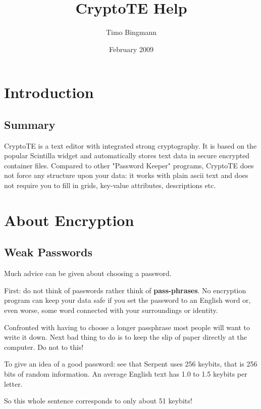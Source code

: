 \documentclass[a4paper,12pt,twoside]{article}
\title{CryptoTE Help}
\author{Timo Bingmann}
\date{February 2009}
\begin{document}
\pagestyle{plain}
\maketitle
\tableofcontents

\clearpage
\pagestyle{fancy}

\section{Introduction}\label{Introduction}

\subsection{Summary}\label{Summary}

CryptoTE is a text editor with integrated strong cryptography. It is based on
the popular Scintilla widget and automatically stores text data in secure
encrypted container files. Compared to other "Password Keeper" programs,
CryptoTE does not force any structure upon your data: it works with plain ascii
text and does not require you to fill in grids, key-value attributes,
descriptions etc.

\section{About Encryption}\label{AboutEncryption}

\subsection{Weak Passwords}\label{WeakPasswords}

Much advice can be given about choosing a password.

First: do not think of passwords rather think of \textbf{pass-phrases}. No encryption program can keep your data safe if you set the password to an English word or, even worse, some word connected with your surroundings or identity.

Confronted with having to choose a longer passphrase most people will want to write it down. Next bad thing to do is to keep the slip of paper directly at the computer. Do not to this!

To give an idea of a good password: see that Serpent uses 256 keybits, that is 256 bits of random information. An average English text has 1.0 to 1.5 keybits per letter.

So this whole sentence corresponds to only about 51 keybits!
\end{document}

